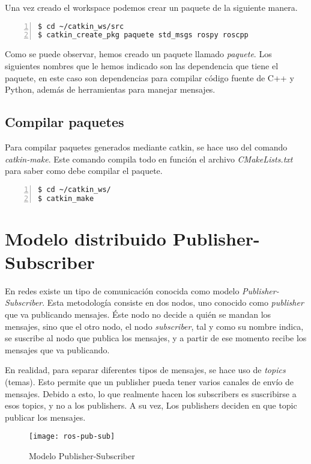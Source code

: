 		Una vez creado el workspace podemos crear un paquete de la siguiente manera.
		
		\begin{lstlisting}[style=consola,numbers=left]
$ cd ~/catkin_ws/src
$ catkin_create_pkg paquete std_msgs rospy roscpp
		\end{lstlisting}
		
		Como se puede observar, hemos creado un paquete llamado \textit{paquete}. Los siguientes nombres que le hemos indicado son las dependencia que tiene el paquete, en este caso son dependencias para compilar código fuente de C++ y Python, además de herramientas para manejar mensajes.
		
		\subsection{Compilar paquetes}
		
		Para compilar paquetes generados mediante catkin, se hace uso del comando \emph{catkin-make}. Este comando compila todo en función el archivo \emph{CMakeLists.txt} para saber como debe compilar el paquete.
		
		\begin{lstlisting}[style=consola,numbers=left]
$ cd ~/catkin_ws/
$ catkin_make
		\end{lstlisting}
		
	\section{Modelo distribuido Publisher-Subscriber}
	
	En redes existe un tipo de comunicación conocida como modelo \emph{Publisher-Subscriber}. Esta metodología consiste en dos nodos, uno conocido como \emph{publisher} que va publicando mensajes. Éste nodo no decide a quién se mandan los mensajes, sino que el otro nodo, el nodo \emph{subscriber}, tal y como su nombre indica, se suscribe al nodo que publica los mensajes, y a partir de ese momento recibe los mensajes que va publicando.
	
	En realidad, para separar diferentes tipos de mensajes, se hace uso de \emph{topics} (temas). Esto permite que un publisher pueda tener varios canales de envío de mensajes. Debido a esto, lo que realmente hacen los subscribers es suscribirse a esos topics, y no a los publishers. A su vez, Los publishers deciden en que topic publicar los mensajes.
	
	\begin{figure}[H]
		\centering
		\texttt{[image: ros-pub-sub]}
		\caption{Modelo Publisher-Subscriber}
		\label{fig:ros-pub-sub}
	\end{figure}